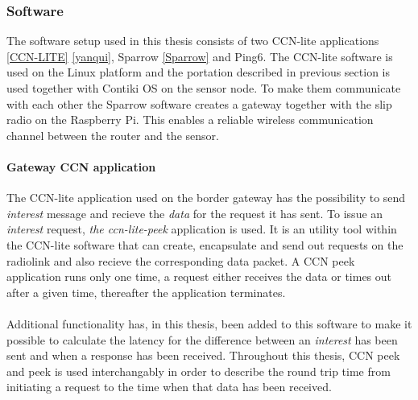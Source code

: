 \subsubsection{Software}
The software setup used in this thesis consists of two CCN-lite applications \ref{CCN-LITE} \ref{yanqui}, Sparrow \ref{Sparrow} and Ping6. The CCN-lite software is used on the Linux platform and the portation described in previous section is used together with Contiki OS on the sensor node. To make them communicate with each other the Sparrow software creates a gateway together with the slip radio on the Raspberry Pi. This enables a reliable wireless communication channel between the router and the sensor.

\paragraph{Gateway CCN application}
The CCN-lite application used on the border gateway has the possibility to send \textit{interest} message and recieve the \textit{data} for the request it has sent. To issue an \textit{interest} request, \textit{the ccn-lite-peek} application is used. It is an utility tool within the CCN-lite software that can create, encapsulate and send out requests on the radiolink and also recieve the corresponding data packet. A CCN peek application runs only one time, a request either receives the data or times out after a given time, thereafter the application terminates.\\\\
Additional functionality has, in this thesis, been added to this software to make it possible to calculate the latency for the difference between an \textit{interest} has been sent and when a response has been received. Throughout this thesis, CCN peek and peek is used interchangably in order to describe the round trip time from initiating a request to the time when that data has been received. 

